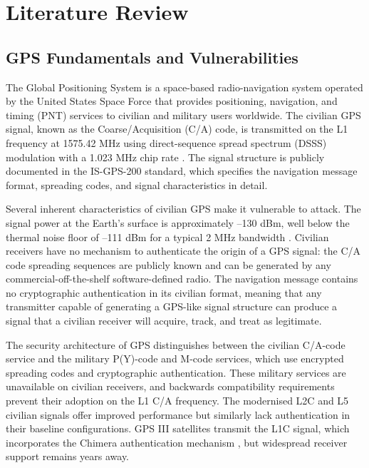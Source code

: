 \documentclass[electronics,article,accept,moreauthors]{Definitions/mdpi}
\begin{document}
\section{Literature Review}
\label{sec:litreview}

\subsection{GPS Fundamentals and Vulnerabilities}
\label{sec:gpsfundamentals}

The Global Positioning System is a space-based radio-navigation system operated by the United States Space Force that provides positioning, navigation, and timing (PNT) services to civilian and military users worldwide. The civilian GPS signal, known as the Coarse/Acquisition (C/A) code, is transmitted on the L1 frequency at 1575.42 MHz using direct-sequence spread spectrum (DSSS) modulation with a 1.023 MHz chip rate \citep{yuan2023}. The signal structure is publicly documented in the IS-GPS-200 standard, which specifies the navigation message format, spreading codes, and signal characteristics in detail.

Several inherent characteristics of civilian GPS make it vulnerable to attack. The signal power at the Earth's surface is approximately --130 dBm, well below the thermal noise floor of --111 dBm for a typical 2 MHz bandwidth \citep{humphreys2012}. Civilian receivers have no mechanism to authenticate the origin of a GPS signal: the C/A code spreading sequences are publicly known and can be generated by any commercial-off-the-shelf software-defined radio. The navigation message contains no cryptographic authentication in its civilian format, meaning that any transmitter capable of generating a GPS-like signal structure can produce a signal that a civilian receiver will acquire, track, and treat as legitimate.

The security architecture of GPS distinguishes between the civilian C/A-code service and the military P(Y)-code and M-code services, which use encrypted spreading codes and cryptographic authentication. These military services are unavailable on civilian receivers, and backwards compatibility requirements prevent their adoption on the L1 C/A frequency. The modernised L2C and L5 civilian signals offer improved performance but similarly lack authentication in their baseline configurations. GPS III satellites transmit the L1C signal, which incorporates the Chimera authentication mechanism \citep{schmidt2016}, but widespread receiver support remains years away.
\end{document}

